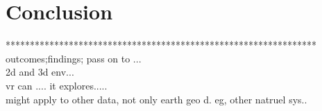 \label{chapter-conclusion}
\chapter{Conclusion}

****************************************************************\\%
outcomes;findings; pass  on to ...\\
2d and 3d env...\\
vr can .... it explores.....\\
might apply to other data, not only earth geo d.   eg, other natruel sys..\\

